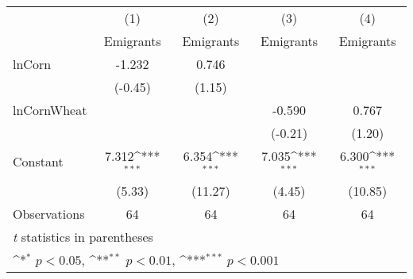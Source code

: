 {
\def\sym#1{\ifmmode^{#1}\else\(^{#1}\)\fi}
\begin{tabular}{l*{4}{c}}
\toprule
                    &\multicolumn{1}{c}{(1)}&\multicolumn{1}{c}{(2)}&\multicolumn{1}{c}{(3)}&\multicolumn{1}{c}{(4)}\\
                    &\multicolumn{1}{c}{Emigrants}&\multicolumn{1}{c}{Emigrants}&\multicolumn{1}{c}{Emigrants}&\multicolumn{1}{c}{Emigrants}\\
\midrule
lnCorn              &      -1.232         &       0.746         &                     &                     \\
                    &     (-0.45)         &      (1.15)         &                     &                     \\
\addlinespace
lnCornWheat         &                     &                     &      -0.590         &       0.767         \\
                    &                     &                     &     (-0.21)         &      (1.20)         \\
\addlinespace
Constant            &       7.312\sym{***}&       6.354\sym{***}&       7.035\sym{***}&       6.300\sym{***}\\
                    &      (5.33)         &     (11.27)         &      (4.45)         &     (10.85)         \\
\midrule
Observations        &          64         &          64         &          64         &          64         \\
\bottomrule
\multicolumn{5}{l}{\footnotesize \textit{t} statistics in parentheses}\\
\multicolumn{5}{l}{\footnotesize \sym{*} \(p<0.05\), \sym{**} \(p<0.01\), \sym{***} \(p<0.001\)}\\
\end{tabular}
}
